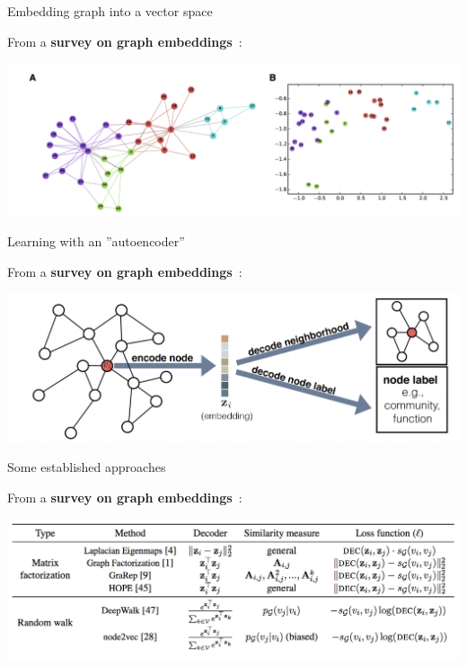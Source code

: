 \begin{frame}{Embedding graph into a vector space}

From a \textbf{survey on graph embeddings}~\cite{hamilton2017representation}:

\begin{center}
	\includegraphics[width=\textwidth]{figures/ge-fig1}
\end{center}

	
\end{frame}



\begin{frame}{Learning with an ''autoencoder''}

From a \textbf{survey on graph embeddings}~\cite{hamilton2017representation}:

\begin{center}
	\includegraphics[width=\textwidth]{figures/ge-fig2}
\end{center}

	
\end{frame}




\begin{frame}{Some established approaches}

From a \textbf{survey on graph embeddings}~\cite{hamilton2017representation}:

\begin{center}
	\includegraphics[width=\textwidth]{figures/ge-fig3}
\end{center}

	
\end{frame}





